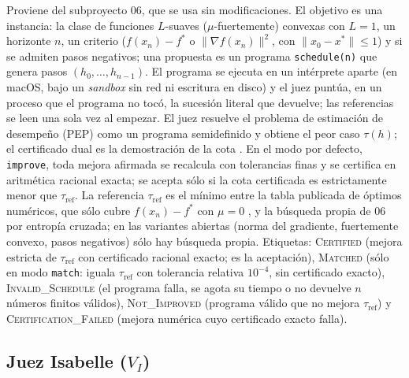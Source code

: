 \documentclass[11pt,a4paper]{article}
\begin{document}
Proviene del subproyecto 06, que se usa sin modificaciones. El objetivo es una instancia: la clase de funciones $L$-suaves ($\mu$-fuertemente) convexas con $L = 1$, un horizonte $n$, un criterio ($f(x_n) - f^*$ o $\|\nabla f(x_n)\|^2$, con $\|x_0 - x^*\| \le 1$) y si se admiten pasos negativos; una propuesta es un programa \texttt{schedule(n)} que genera pasos $(h_0,\dots,h_{n-1})$. El programa se ejecuta en un intérprete aparte (en macOS, bajo un \emph{sandbox} sin red ni escritura en disco) y el juez puntúa, en un proceso que el programa no tocó, la sucesión literal que devuelve; las referencias se leen una sola vez al empezar. El juez resuelve el problema de estimación de desempeño (PEP) como un programa semidefinido y obtiene el peor caso $\tau(h)$; el certificado dual es la demostración de la cota \citep{DroriTeboulle2014,TaylorHendrickxGlineur2017}. En el modo por defecto, \texttt{improve}, toda mejora afirmada se recalcula con tolerancias finas y se certifica en aritmética racional exacta; se acepta sólo si la cota certificada es estrictamente menor que $\tau_{\mathrm{ref}}$. La referencia $\tau_{\mathrm{ref}}$ es el mínimo entre la tabla publicada de óptimos numéricos, que sólo cubre $f(x_n) - f^*$ con $\mu = 0$ \citep{DasGuptaVanParysRyu2024,GrimmerShuWang2024}, y la búsqueda propia de 06 por entropía cruzada; en las variantes abiertas (norma del gradiente, fuertemente convexo, pasos negativos) sólo hay búsqueda propia. Etiquetas: \textsc{Certified} (mejora estricta de $\tau_{\mathrm{ref}}$ con certificado racional exacto; es la aceptación), \textsc{Matched} (sólo en modo \texttt{match}: iguala $\tau_{\mathrm{ref}}$ con tolerancia relativa $10^{-4}$, sin certificado exacto), \textsc{Invalid\_Schedule} (el programa falla, se agota su tiempo o no devuelve $n$ números finitos válidos), \textsc{Not\_Improved} (programa válido que no mejora $\tau_{\mathrm{ref}}$) y \textsc{Certification\_Failed} (mejora numérica cuyo certificado exacto falla).

\subsection{Juez Isabelle ($V_I$)}
\end{document}
